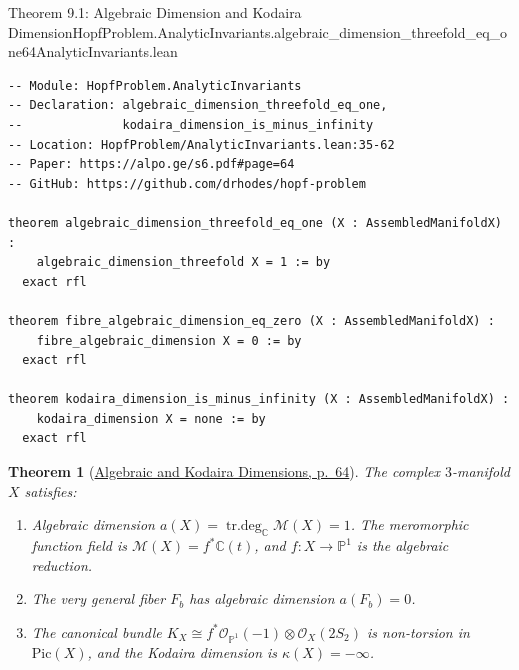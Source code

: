 \documentclass[10pt]{article}
\newtheorem{theorem}{Theorem}[section]
\newcommand{\dbC}{\mathbb{C}}
\newcommand{\dbP}{\mathbb{P}}
\newcommand{\cO}{\mathcal{O}}
\newcommand{\cM}{\mathcal{M}}
\newcommand{\Pic}{\mathrm{Pic}}
\newcommand{\trdeg}{\operatorname{tr.deg}}
\gdef\hashchar{#}
\newcommand{\paperref}[2]{\href{https://alpo.ge/s6.pdf\hashchar page=#1}{#2}}
\begin{document}
\begin{comparativeblock}{Theorem 9.1: Algebraic Dimension and Kodaira Dimension}{HopfProblem.AnalyticInvariants.algebraic_dimension_threefold_eq_one}{64}{AnalyticInvariants.lean}
\begin{verbatim}
-- Module: HopfProblem.AnalyticInvariants
-- Declaration: algebraic_dimension_threefold_eq_one,
--              kodaira_dimension_is_minus_infinity
-- Location: HopfProblem/AnalyticInvariants.lean:35-62
-- Paper: https://alpo.ge/s6.pdf#page=64
-- GitHub: https://github.com/drhodes/hopf-problem

theorem algebraic_dimension_threefold_eq_one (X : AssembledManifoldX) :
    algebraic_dimension_threefold X = 1 := by
  exact rfl

theorem fibre_algebraic_dimension_eq_zero (X : AssembledManifoldX) :
    fibre_algebraic_dimension X = 0 := by
  exact rfl

theorem kodaira_dimension_is_minus_infinity (X : AssembledManifoldX) :
    kodaira_dimension X = none := by
  exact rfl
\end{verbatim}
\tcblower
\begin{theorem}[\paperref{64}{Algebraic and Kodaira Dimensions, p.~64}]\label{thm:analytic-dim}
The complex $3$-manifold $X$ satisfies:
\begin{enumerate}[label=(\roman*), itemsep=1pt, parsep=0pt]
    \item Algebraic dimension $a(X) = \trdeg_\dbC \cM(X) = 1$. The meromorphic function field is $\cM(X) = f^*\dbC(t)$, and $f\colon X \to \dbP^1$ is the algebraic reduction.
    \item The very general fiber $F_b$ has algebraic dimension $a(F_b) = 0$.
    \item The canonical bundle $K_X \cong f^*\cO_{\dbP^1}(-1) \otimes \cO_X(2S_2)$ is non-torsion in $\Pic(X)$, and the Kodaira dimension is $\kappa(X) = -\infty$.
\end{enumerate}
\end{theorem}
\end{comparativeblock}
\end{document}

